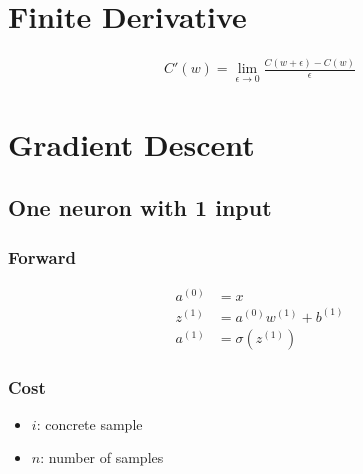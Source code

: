 \documentclass{article}
\begin{document}
\section{Finite Derivative}

\begin{align}
  C'(w) = \lim_{\epsilon \to 0}\frac{C(w + \epsilon) - C(w)}{\epsilon}
\end{align}

\section{Gradient Descent}

\newcommand{\pd}[2]{\frac{\partial #1}{\partial #2}}
\def\avgsum[#1,#2]{\frac{1}{#2}\sum_{#1=1}^{#2}}
\def\d{2.0}

\subsection{One neuron with 1 input}

\begin{center}
\end{center}

\subsubsection{Forward}

\begin{align}
    a^{(0)} &= x \\
    z^{(1)} &= a^{(0)}w^{(1)}+b^{(1)} \\
    a^{(1)} &= \sigma(z^{(1)})
\end{align}

\subsubsection{Cost}

\begin{itemize}
\item $i$: concrete sample
\item $n$: number of samples
\end{itemize}
\end{document}
